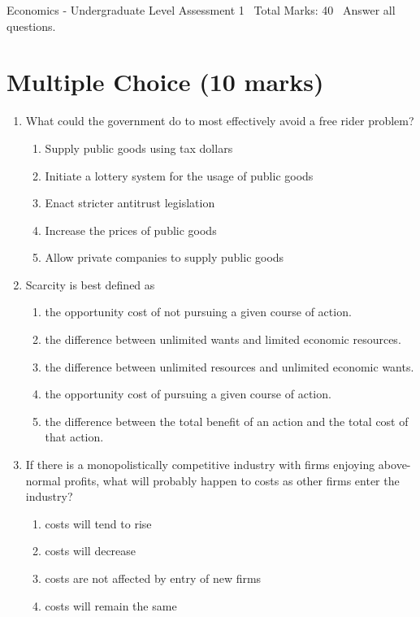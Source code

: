 \documentclass[12pt]{article}
\begin{document}
\begin{center}
Economics - Undergraduate Level Assessment 1 \
Total Marks: 40 \
Answer all questions.
\end{center}

\section*{Multiple Choice (10 marks)}
\begin{enumerate}[label=\arabic*.]
\item What could the government do to most effectively avoid a free rider problem?
\begin{enumerate}[label=(\alph*)]
    \item Supply public goods using tax dollars
    \item Initiate a lottery system for the usage of public goods
    \item Enact stricter antitrust legislation
    \item Increase the prices of public goods
    \item Allow private companies to supply public goods
\end{enumerate}
\item Scarcity is best defined as
\begin{enumerate}[label=(\alph*)]
    \item the opportunity cost of not pursuing a given course of action.
    \item the difference between unlimited wants and limited economic resources.
    \item the difference between unlimited resources and unlimited economic wants.
    \item the opportunity cost of pursuing a given course of action.
    \item the difference between the total benefit of an action and the total cost of that action.
\end{enumerate}
\item If there is a monopolistically competitive industry with firms enjoying above-normal profits, what will probably happen to costs as other firms enter the industry?
\begin{enumerate}[label=(\alph*)]
    \item costs will tend to rise
    \item costs will decrease
    \item costs are not affected by entry of new firms
    \item costs will remain the same

\end{enumerate}
\end{enumerate}
\end{document}
